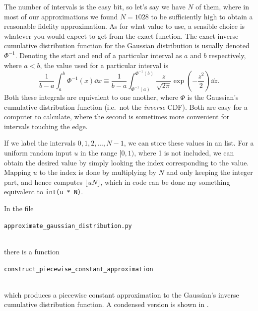 \documentclass[11pt,a4paper,twoside,english]{extarticle}
\newcommand{\singlecodeline}[1]{\\[1em]\centerline{\lstinline[basicstyle=\ttfamily]$#1$}\\[1em]}
\begin{document}
The number of intervals is the easy bit, so let's say we have $ N $ of them, where in most of our approximations we found $ N = 1028 $ to be sufficiently high to obtain a reasonable fidelity approximation. As for what value to use, a sensible choice is whatever you would expect to get from the exact function. The exact inverse cumulative distribution function for the Gaussian distribution is usually denoted $ \Phi^{-1} $. Denoting the start and end of a particular interval as $ a $ and $ b $ respectively, where $ a < b $, the value used for a particular interval is
\begin{equation}
\dfrac{1}{b - a}\int_a^b \Phi^{-1}(x) \dd{x} \equiv \dfrac{1}{b - a} \int_{\Phi^{-1}(a)}^{\Phi^{-1}(b)} \dfrac{z}{\sqrt{2\pi}} \exp(-\dfrac{z^2}{2}) \dd{z}.
\end{equation}
Both these integrals are equivalent to one another, where $ \Phi $ is the Gaussian's cumulative distribution function (i.e.~not the \emph{inverse} CDF). Both are easy for a computer to calculate, where the second is sometimes more convenient for intervals touching the edge. 

If we label the intervals $ 0, 1, 2,\ldots, N-1 $, we can store these values in an list. For a uniform random input $ u $ in the range $ [0, 1) $, where 1 is not included, we can obtain the desired value by simply looking the index corresponding to the value. Mapping $ u $ to the index is done by multiplying by $ N $ and only keeping the integer part, and hence computes $ \lfloor u N \rfloor $, which in code can be done my something equivalent to \verb|int(u * N)|.

In the file \singlecodeline{approximate_gaussian_distribution.py} there is a function \singlecodeline{construct_piecewise_constant_approximation} which produces a piecewise constant approximation to the Gaussian's inverse cumulative distribution function. A condensed version is shown in .
\end{document}
